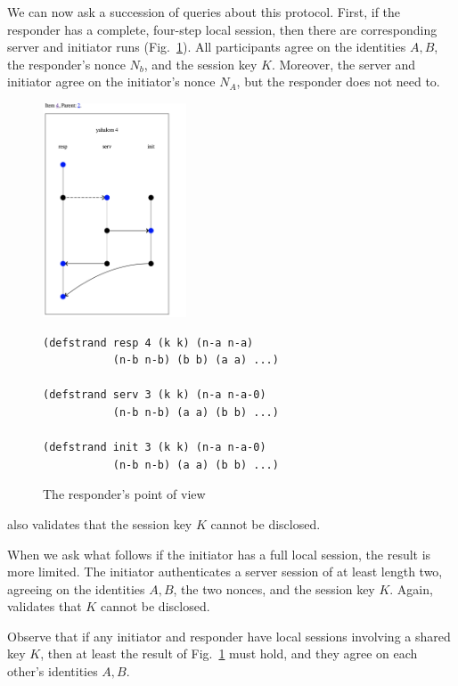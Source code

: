 We can now ask {\cpsa} a succession of queries about this protocol.
First, if the responder has a complete, four-step local session, then
there are corresponding server and initiator runs
(Fig.~\ref{fig:yahalom:ch:resp:pov}).  All participants agree on the
identities $A,B$, the responder's nonce $N_b$, and the session key
$K$.  Moreover, the server and initiator agree on the initiator's
nonce $N_A$, but the responder does not need to.
%
\begin{figure}
  \centering
  \begin{minipage}[c][2.5in][c]{.4\linewidth}
    \includegraphics[height=2.5in]{yahalom_ch_resp_pov.png}
  \end{minipage}
  \begin{minipage}[c][2.5in][c]{.5\linewidth}\small
\begin{verbatim}(defstrand resp 4 (k k) (n-a n-a)
           (n-b n-b) (b b) (a a) ...)

(defstrand serv 3 (k k) (n-a n-a-0)
           (n-b n-b) (a a) (b b) ...)

(defstrand init 3 (k k) (n-a n-a-0)
           (n-b n-b) (a a) (b b) ...)
\end{verbatim}
  \end{minipage}
  \caption{The responder's point of view}
  \label{fig:yahalom:ch:resp:pov}
\end{figure}
%
{\cpsa} also validates that the session key $K$ cannot be disclosed.

When we ask what follows if the initiator has a full local session,
the result is more limited.  The initiator authenticates a server
session of at least length two, agreeing on the identities $A,B$, the
two nonces, and the session key $K$.  Again, {\cpsa} validates that
$K$ cannot be disclosed.

Observe that if any initiator and responder have local sessions
involving a shared key $K$, then at least the result of
Fig.~\ref{fig:yahalom:ch:resp:pov} must hold, and they agree on each
other's identities $A,B$.

